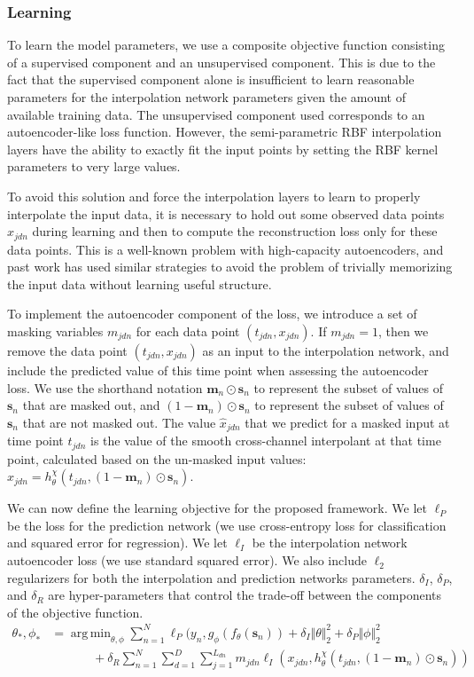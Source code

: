 \documentclass{article} \usepackage{iclr2019_conference,times}
\DeclareMathOperator*{\argmin}{arg\,min}
\newcommand{\mbf}[1]{\mathbf{#1}}
\begin{document}
\subsubsection{Learning} To learn the model parameters, we use a 
composite objective function consisting of a supervised component
and an unsupervised component. This is due to the fact that the 
supervised component alone is insufficient to learn reasonable
parameters for the interpolation network parameters given the amount
of available training data. The unsupervised component used 
corresponds to an autoencoder-like loss function. However,
the semi-parametric RBF interpolation layers have the ability to
exactly fit the input points by setting the RBF kernel parameters
to very large values. 

To avoid this solution and force the interpolation
layers to learn to properly interpolate the input data, it is necessary
to hold out some observed data points $x_{jdn}$ during learning and then
to compute the reconstruction loss only for these data points. This is a 
well-known problem with high-capacity autoencoders, and past work 
has used similar strategies to avoid the problem of trivially 
memorizing the input data without learning useful structure.

To implement the autoencoder component of the loss, we introduce
a set of masking variables $m_{jdn}$ for each data point $(t_{jdn}, x_{jdn})$.
If $m_{jdn}=1$, then we remove the data point $(t_{jdn}, x_{jdn})$ as an input
to the interpolation network, and include the predicted value of this time point
when assessing the autoencoder loss. We use the shorthand notation $\mbf{m}_n \odot \mbf{s}_n$ to represent
the subset of values of $\mbf{s}_n$ that are masked out, and $(1-\mbf{m}_n) \odot \mbf{s}_n$
to represent the subset of values of $\mbf{s}_n$ that are not masked out. 
The value $\hat{x}_{jdn}$ that we predict for a masked input at time  
point $t_{jdn}$ is the value of the smooth cross-channel interpolant at that time point, calculated
based on the un-masked input values: $\hat{x}_{jdn} = h_\theta^{\chi}(t_{jdn}, (1-\mbf{m}_n) \odot \mbf{s}_n)$.

We can now define the learning objective for
the proposed framework. We let $\ell_P$ be the loss for the prediction
network (we use cross-entropy loss for classification and squared 
error for regression). We let $\ell_I$ be the interpolation network autoencoder loss (we use standard squared error).
We also include $\ell_2$ regularizers for both the interpolation
and prediction networks parameters. $\delta_I$, $\delta_P$, and $\delta_R$ are
hyper-parameters that control the trade-off between the components of the
objective function.
\begin{align}
	\theta_*,\phi_* &=\argmin_{\theta,\phi} \sum_{n=1}^N \ell_P(y_n, g_{\phi}(f_{\theta}(\mbf{s}_n))
	+ \delta_I \Vert \theta \Vert_2^2 + \delta_P \Vert \phi \Vert_2^2 \\
\nonumber &\;\;\;\;\;\;\;\;\;\;\;\;+ \delta_R \sum_{n=1}^N \sum_{d=1}^D \sum_{j=1}^{L_{dn}} m_{jdn} \ell_I(x_{jdn},h_\theta^\chi(t_{jdn}, (1-\mbf{m}_n) \odot \mbf{s}_n))
\end{align}
\end{document}
